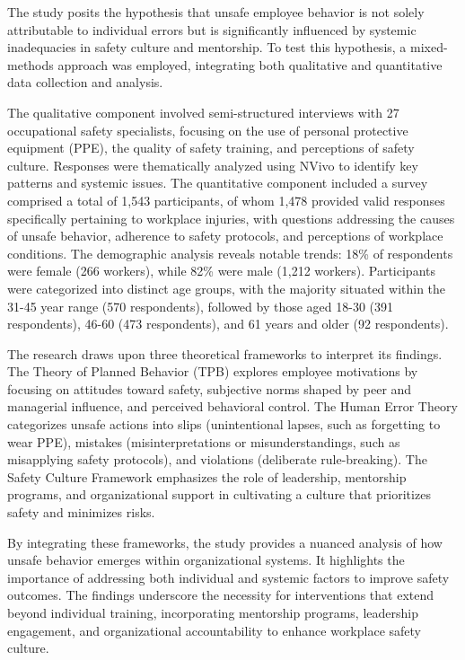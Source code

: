 The study posits the hypothesis that unsafe employee behavior is not
solely attributable to individual errors but is significantly influenced
by systemic inadequacies in safety culture and mentorship. To test this
hypothesis, a mixed-methods approach was employed, integrating both
qualitative and quantitative data collection and analysis.

The qualitative component involved semi-structured interviews with 27
occupational safety specialists, focusing on the use of personal
protective equipment (PPE), the quality of safety training, and
perceptions of safety culture. Responses were thematically analyzed
using NVivo to identify key patterns and systemic issues. The
quantitative component included a survey comprised a total of 1,543
participants, of whom 1,478 provided valid responses specifically
pertaining to workplace injuries, with questions addressing the causes
of unsafe behavior, adherence to safety protocols, and perceptions of
workplace conditions. The demographic analysis reveals notable trends:
18\% of respondents were female (266 workers), while 82\% were male
(1,212 workers). Participants were categorized into distinct age groups,
with the majority situated within the 31-45 year range (570
respondents), followed by those aged 18-30 (391 respondents), 46-60 (473
respondents), and 61 years and older (92 respondents).

The research draws upon three theoretical frameworks to interpret its
findings. The Theory of Planned Behavior (TPB) explores employee
motivations by focusing on attitudes toward safety, subjective norms
shaped by peer and managerial influence, and perceived behavioral
control. The Human Error Theory categorizes unsafe actions into slips
(unintentional lapses, such as forgetting to wear PPE), mistakes
(misinterpretations or misunderstandings, such as misapplying safety
protocols), and violations (deliberate rule-breaking). The Safety
Culture Framework emphasizes the role of leadership, mentorship
programs, and organizational support in cultivating a culture that
prioritizes safety and minimizes risks.

By integrating these frameworks, the study provides a nuanced analysis
of how unsafe behavior emerges within organizational systems. It
highlights the importance of addressing both individual and systemic
factors to improve safety outcomes. The findings underscore the
necessity for interventions that extend beyond individual training,
incorporating mentorship programs, leadership engagement, and
organizational accountability to enhance workplace safety culture.


